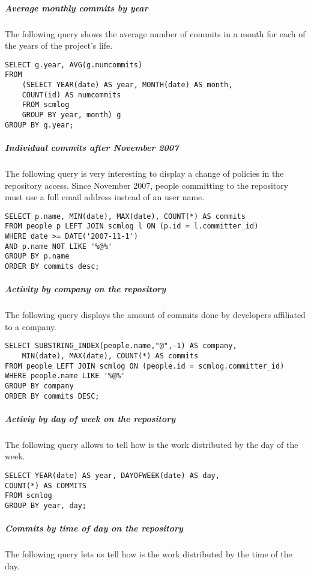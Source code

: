 \subparagraph{Average  monthly commits by year}

The following query shows the average number of commits in a month for each of the years of the project's life.

\begin{verbatim}
SELECT g.year, AVG(g.numcommits) 
FROM 
	(SELECT YEAR(date) AS year, MONTH(date) AS month, 
	COUNT(id) AS numcommits 
	FROM scmlog 
	GROUP BY year, month) g
GROUP BY g.year;
\end{verbatim}

\subparagraph{Individual commits after November 2007}

The following query is very interesting to display a change of policies in the repository access. Since November 2007, people committing to the repository must use a full email address instead of an user name.

\begin{verbatim}
SELECT p.name, MIN(date), MAX(date), COUNT(*) AS commits
FROM people p LEFT JOIN scmlog l ON (p.id = l.committer_id) 
WHERE date >= DATE('2007-11-1') 
AND p.name NOT LIKE '%@%' 
GROUP BY p.name 
ORDER BY commits desc;
\end{verbatim}

\subparagraph{Activity by company on the repository}

The following query displays the amount of commits done by developers affiliated to a company.

\begin{verbatim}
SELECT SUBSTRING_INDEX(people.name,"@",-1) AS company, 
	MIN(date), MAX(date), COUNT(*) AS commits 
FROM people LEFT JOIN scmlog ON (people.id = scmlog.committer_id) 
WHERE people.name LIKE '%@%' 
GROUP BY company 
ORDER BY commits DESC;
\end{verbatim}

\subparagraph{Activiy by day of week on the repository}

The following query allows to tell how is the work distributed by the day of the week.

\begin{verbatim}
SELECT YEAR(date) AS year, DAYOFWEEK(date) AS day, 
COUNT(*) AS COMMITS 
FROM scmlog 
GROUP BY year, day;
\end{verbatim}

\subparagraph{Commits by time of day on the repository}

The following query lets us tell how is the work distributed by the time of the day.

